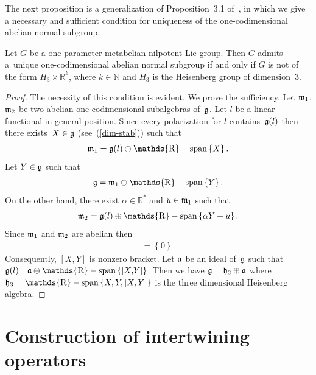 \documentclass[pdftex]{sigma}
\newcommand{\set}[1]{\left\{#1\right\}}
\DeclareMathOperator{\spann}{\mathds{R}-span}
\def\dsr{{\mathds R}}
\def\dsn{{\mathds N}}
\begin{document}
The next proposition is a  generalization of  Proposition~3.1 of~\cite{Hamrouni1}, in which we give a necessary and suf\/f\/icient
condition for  uniqueness of the one-codimensional abelian normal
subgroup.

\begin{proposition}
 Let $G$ be a one-parameter metabelian nilpotent Lie group. Then $G$
admits a~unique one-codimensional
 abelian normal subgroup  if and only if $G$ is not of the form
 $H_3\times \dsr^k$, where $k\in \dsn$ and $H_3$ is the
 Heisenberg group  of dimension~$3$.
\end{proposition}

\begin{proof} The necessity of this condition is evident. We prove
the suf\/f\/iciency. Let $\frak m_1$, $\frak m_2$ be two abelian
one-codimensional subalgebras of~$\frak g$. Let $l$ be a linear
functional in general position. Since every polarization for $l$
contains~$\frak g(l)$ then there exists~$X\in \frak g$ (see~(\ref{dim-stab})) such that
\begin{gather*}
\frak m_1= \frak g(l)\oplus \spann\set{X}.
\end{gather*}
Let $Y\in \frak g$ such that
\begin{gather*}
\frak g=\frak m_1\oplus \spann\set{Y}.
\end{gather*}
On the other hand, there exist $\alpha\in \dsr^*$ and $u\in \frak
m_1$ such that
\begin{gather*}
\frak m_2= \frak g(l)\oplus \spann\set{\alpha Y+u}.
\end{gather*}
Since $\frak m_1$ and $\frak m_2$ are abelian then
\begin{gather*}
[Y, \frak g(l)]=\set{0}.
\end{gather*}
Consequently, $[X,\! Y]$ is  nonzero bracket. Let $\frak a$ be an
ideal of~$\frak g$ such that $\frak g(l)\! =\! \frak a\oplus
\spann\set{[X,\!Y]}$. Then we have
 $\frak g= \frak h_3\oplus \frak a$
 where $\frak h_3=\spann\set{ X,
Y , [X,Y]}$ is the three dimensional Heisenberg algebra.
\end{proof}


\section{Construction of intertwining operators}\label{section5}
\end{document}
